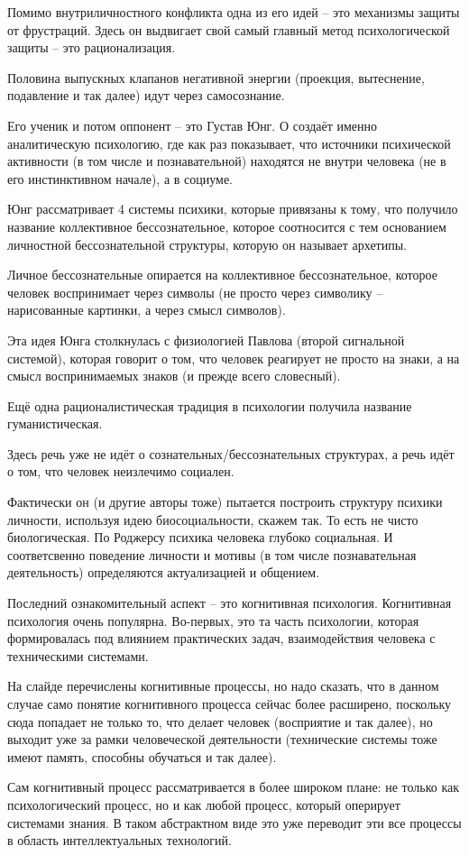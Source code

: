\documentclass[main.tex]{subfiles}
\begin{document}

Помимо внутриличностного конфликта одна из его идей -- это механизмы защиты от фрустраций.
Здесь он выдвигает свой самый главный метод психологической защиты -- это рационализация.

Половина выпускных клапанов негативной энергии (проекция, вытеснение, подавление и так далее) идут через самосознание.
\\


Его ученик и потом оппонент -- это Густав Юнг.
О создаёт именно аналитическую психологию, где как раз показывает, что источники психической активности (в том числе и познавательной) находятся не внутри человека (не в его инстинктивном начале), а в социуме.

Юнг рассматривает 4 системы психики, которые привязаны к тому, что получило название коллективное бессознательное, которое соотносится с тем основанием личностной бессознательной структуры, которую он называет архетипы.

Личное бессознательные опирается на коллективное бессознательное, которое человек воспринимает через символы (не просто через символику -- нарисованные картинки, а через смысл символов).

Эта идея Юнга столкнулась с физиологией Павлова (второй сигнальной системой), которая говорит о том, что человек реагирует не просто на знаки, а на смысл воспринимаемых знаков (и прежде всего словесный).


Ещё одна рационалистическая традиция в психологии получила название гуманистическая.

Здесь речь уже не идёт о сознательных/бессознательных структурах, а речь идёт о том, что человек неизлечимо социален.

Фактически он (и другие авторы тоже) пытается построить структуру психики личности, используя идею биосоциальности, скажем так.
То есть не чисто биологическая.
По Роджерсу психика человека глубоко социальная.
И соответсвенно поведение личности и мотивы (в том числе познавательная деятельность) определяются актуализацией и общением.


Последний ознакомительный аспект -- это когнитивная психология.
Когнитивная психология очень популярна.
Во-первых, это та часть психологии, которая формировалась под влиянием практических задач, взаимодействия человека с техническими системами.

На слайде перечислены когнитивные процессы, но надо сказать, что в данном случае само понятие когнитивного процесса сейчас более расширено, поскольку сюда попадает не только то, что делает человек (восприятие и так далее), но выходит уже за рамки человеческой деятельности (технические системы тоже имеют память, способны обучаться и так далее).

Сам когнитивный процесс рассматривается в более широком плане: не только как психологический процесс, но и как любой процесс, который оперирует системами знания.
В таком абстрактном виде это уже переводит эти все процессы в область интеллектуальных технологий.
\end{document}
